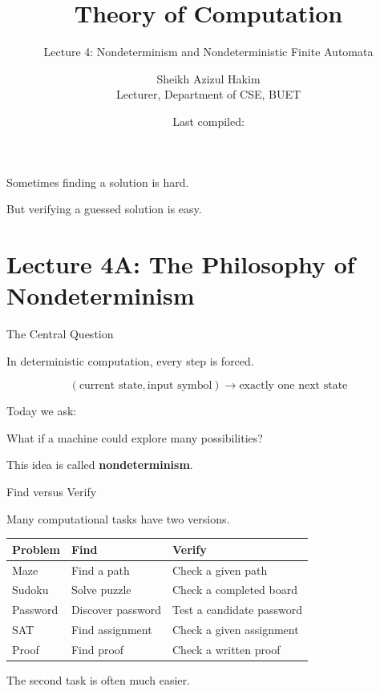 \documentclass[10pt,aspectratio=169]{beamer}
\title{Theory of Computation}
\subtitle{Lecture 4: Nondeterminism and Nondeterministic Finite Automata}
\author{Sheikh Azizul Hakim\\Lecturer, Department of CSE, BUET}
\date{Last compiled: \LastCompiled}
\begin{document}
\maketitle

\begin{frame}[standout]
Sometimes finding a solution is hard.

But verifying a guessed solution is easy.
\end{frame}

\section{Lecture 4A: The Philosophy of Nondeterminism}

\begin{frame}{The Central Question}

In deterministic computation, every step is forced.

\[
(\text{current state},\text{input symbol})
\longrightarrow
\text{exactly one next state}
\]

\vspace{1em}

Today we ask:

\begin{center}
What if a machine could explore many possibilities?
\end{center}

\pause

This idea is called \textbf{nondeterminism}.

\end{frame}

\begin{frame}{Find versus Verify}

Many computational tasks have two versions.

\vspace{0.5em}

\begin{center}
\begin{tabular}{lll}
\toprule
\textbf{Problem} & \textbf{Find} & \textbf{Verify} \\
\midrule
Maze & Find a path & Check a given path \\
Sudoku & Solve puzzle & Check a completed board \\
Password & Discover password & Test a candidate password \\
SAT & Find assignment & Check a given assignment \\
Proof & Find proof & Check a written proof \\
\bottomrule
\end{tabular}
\end{center}

\vspace{0.7em}

\pause
The second task is often much easier.

\end{frame}
\end{document}
